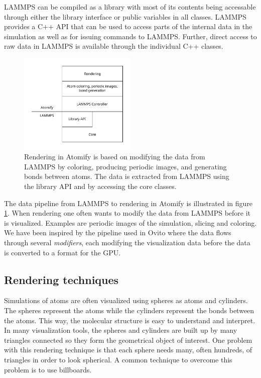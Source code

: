 \documentclass[aps,pre,twocolumn,letterpaper,floatfix,nofootinbib]{revtex4}
\begin{document}
LAMMPS can be compiled as a library with most of its contents being accessable
through either the library interface or public variables in all classes.
LAMMPS provides a C++ API that can be used to access parts of the internal data
in the simulation as well as for issuing commands to LAMMPS.
Further, direct access to raw data in LAMMPS is available through the individual
C++ classes.

\begin{figure}
	\centering
	\includegraphics[width=0.5\textwidth]{figures/data-pipeline.pdf}
	\caption{Rendering in Atomify is based on modifying the data from LAMMPS
    by coloring, producing periodic images, and generating bonds between atoms.
    The data is extracted from LAMMPS using the library API and by accessing
    the core classes.}
	\label{fig:data-pipeline}
\end{figure}

The data pipeline from LAMMPS to rendering in Atomify is illustrated in figure
\ref{fig:data-pipeline}.
When rendering one often wants to modify the data from LAMMPS before it is
visualized.
Examples are periodic images of the simulation,
slicing and coloring.
We have been inspired by the pipeline used in Ovito where the data flows through
several \textit{modifiers}, each modifying the visualization data before the
data is converted to a format for the GPU.

\subsection{Rendering techniques}

Simulations of atoms are often visualized using spheres as atoms and cylinders.
The spheres represent the atoms while the cylinders represent the bonds between
the atoms.
This way, the molecular structure is easy to understand and interpret.
In many visualization tools, the spheres and cylinders are built up by many
triangles connected so they form the geometrical object of interest.
One problem with this rendering technique is that each sphere needs many,
often hundreds, of triangles in order to look spherical.
A common technique to overcome this problem is to use billboards.
\end{document}

